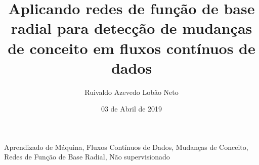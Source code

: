 \documentclass[qual, classic, a4paper]{ufbathesis}
\institute{Instituto de Matem\'{a}tica}
\title{Aplicando redes de função de base radial para detecção de mudanças de conceito em fluxos contínuos de dados}
\date{03 de Abril de 2019}
\author{Ruivaldo Azevedo Lobão Neto}
\begin{document}
\pgcompfrontpage

\frontmatter

\pgcomppresentationpage










\resumo

\blindtext

\begin{keywords}
    Aprendizado de Máquina, Fluxos Contínuos de Dados, Mudanças de Conceito, Redes de Função de Base Radial, Não supervisionado
\end{keywords}
\end{document}
